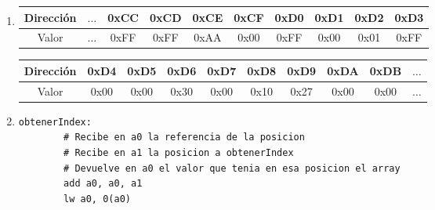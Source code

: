 \begin{enumerate}
\item
    \begin{center}
    \begin{tabular}{ |c|c|c|c|c|c|c|c|c|c|} 
        \hline
        Dirección & $\dots$ & 0xCC & 0xCD & 0xCE & 0xCF & 0xD0 & 0xD1 & 0xD2 & 0xD3   \\
        \hline       %
        Valor     & $\dots$ & 0xFF & 0xFF & 0xAA & 0x00 & 0xFF & 0x00 & 0x01 & 0xFF   \\
        \hline
        
    \end{tabular}
    \end{center}

    \begin{center}
        \begin{tabular}{ |c|c|c|c|c|c|c|c|c|c|} 
            \hline
            Dirección & 0xD4 & 0xD5 & 0xD6 & 0xD7 & 0xD8 & 0xD9 & 0xDA & 0xDB & $\dots$ \\
            \hline
            Valor     & 0x00 & 0x00 & 0x30 & 0x00 & 0x10 & 0x27 & 0x00 & 0x00 &$\dots$ \\
            \hline
        \end{tabular}
    \end{center}

\item
\begin{mdframed}[backgroundcolor=light-gray, roundcorner=10pt,leftmargin=1, rightmargin=1, innerleftmargin=15, innertopmargin=1.5,innerbottommargin=1.5, outerlinewidth=1, linecolor=light-gray]
    \begin{lstlisting}[language={[RISC-V]Assembler}]
        obtenerIndex:
        # Recibe en a0 la referencia de la posicion
        # Recibe en a1 la posicion a obtenerIndex
        # Devuelve en a0 el valor que tenia en esa posicion el array
        add a0, a0, a1
        lw a0, 0(a0)
    \end{lstlisting}
    \end{mdframed}
\end{enumerate}

    

    